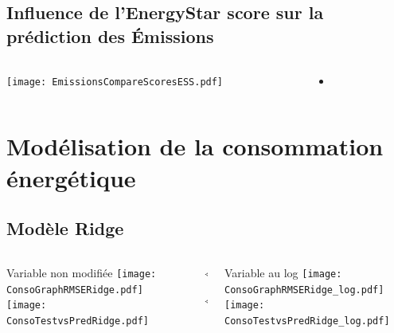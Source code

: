 \documentclass[8pt,aspectratio=169,hyperref={unicode=true}]{beamer}
\begin{document}
\subsection{Influence de l'EnergyStar score sur la prédiction des Émissions}
\begin{frame}{\insertsubsection}
  \begin{columns}
    \begin{column}{.6\textwidth}
      \centering
      \texttt{[image: EmissionsCompareScoresESS.pdf]}
    \end{column}
    \begin{column}{.4\textwidth}
      \begin{itemize}
        \item
      \end{itemize}
    \end{column}
  \end{columns}
\end{frame}

\section[Modélisation consommation]{Modélisation de la consommation énergétique}
\subsection{Modèle Ridge}
\begin{frame}{\insertsubsection}
  \begin{columns}[t]
    \begin{column}{.33\textwidth}
      \centering Variable non modifiée
      \texttt{[image: ConsoGraphRMSERidge.pdf]}
      \texttt{[image: ConsoTestvsPredRidge.pdf]}
    \end{column}
    \begin{column}{.33\textwidth}
      $\Longleftarrow$
      \scriptsize
      {\centering
        }
      

      \normalsize
      $\Longleftarrow$

      \raggedleft{$\Longrightarrow$}
      \scriptsize
      {\centering
        }
      

      \normalsize
      \raggedleft{$\Longrightarrow$}
    \end{column}
    \begin{column}{.33\textwidth}
      \centering Variable au log
      \texttt{[image: ConsoGraphRMSERidge\_log.pdf]}
      \texttt{[image: ConsoTestvsPredRidge\_log.pdf]}
    \end{column}
  \end{columns}
\end{frame}
\end{document}
